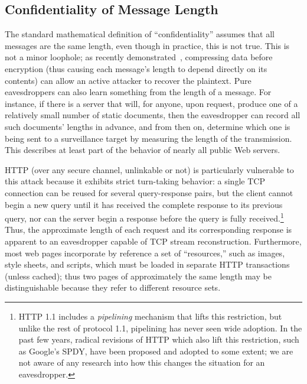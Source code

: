 \documentclass[oneside]{zarticle}
\begin{document}
\subsection{Confidentiality of Message Length}

The standard mathematical definition of “confidentiality” assumes that
all messages are the same length, even though in practice, this is not
true.  This is not a minor loophole; as recently
demonstrated~\cite{duong2012crime,gluck2013breach}, compressing data
before encryption (thus causing each message's length to depend
directly on its contents) can allow an active attacker to recover the
plaintext.  Pure eavesdroppers can also learn something from the
length of a message.  For instance, if there is a server that will,
for anyone, upon request, produce one of a relatively small number of
static documents, then the eavesdropper can record all such documents'
lengths in advance, and from then on, determine which one is being
sent to a surveillance target by measuring the length of the
transmission.  This describes at least part of the behavior of nearly
all public Web servers.

HTTP (over any secure channel, unlinkable or not) is particularly
vulnerable to this attack because it exhibits strict turn-taking
behavior: a single TCP connection can be reused for several
query-response pairs, but the client cannot begin a new query until it
has received the complete response to its previous query, nor can the
server begin a response before the query is fully
received.\footnote{HTTP 1.1 includes a \emph{pipelining} mechanism
  that lifts this restriction, but unlike the rest of protocol 1.1,
  pipelining has never seen wide adoption.  In the past few years,
  radical revisions of HTTP which also lift this restriction, such as
  Google's SPDY, have been proposed and adopted to some extent; we are
  not aware of any research into how this changes the situation for an
  eavesdropper.}  Thus, the approximate length of each request and its
corresponding response is apparent to an eavesdropper capable of TCP
stream reconstruction.  Furthermore, most web pages incorporate by
reference a set of “resources,” such as images, style sheets, and
scripts, which must be loaded in separate HTTP transactions (unless
cached); thus two pages of approximately the same length may be
distinguishable because they refer to different resource sets.
\end{document}
